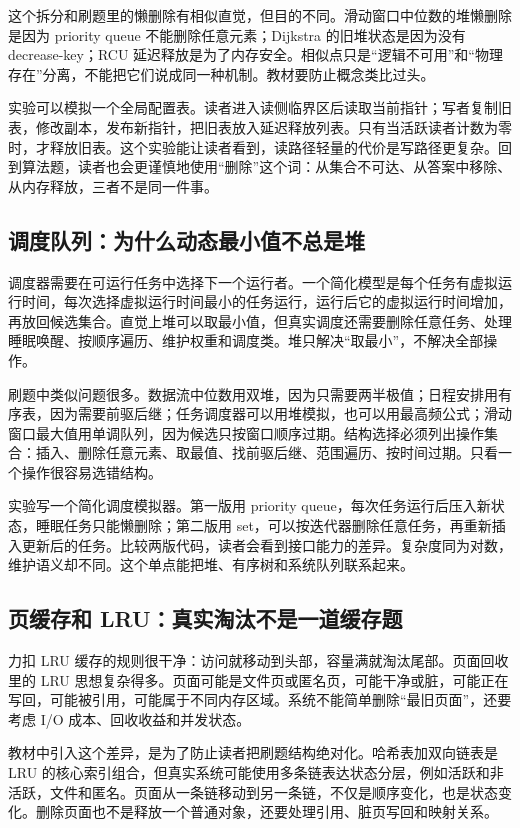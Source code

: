 这个拆分和刷题里的懒删除有相似直觉，但目的不同。滑动窗口中位数的堆懒删除是因为 priority queue 不能删除任意元素；Dijkstra 的旧堆状态是因为没有 decrease-key；RCU 延迟释放是为了内存安全。相似点只是“逻辑不可用”和“物理存在”分离，不能把它们说成同一种机制。教材要防止概念类比过头。

实验可以模拟一个全局配置表。读者进入读侧临界区后读取当前指针；写者复制旧表，修改副本，发布新指针，把旧表放入延迟释放列表。只有当活跃读者计数为零时，才释放旧表。这个实验能让读者看到，读路径轻量的代价是写路径更复杂。回到算法题，读者也会更谨慎地使用“删除”这个词：从集合不可达、从答案中移除、从内存释放，三者不是同一件事。

\subsection{调度队列：为什么动态最小值不总是堆}

调度器需要在可运行任务中选择下一个运行者。一个简化模型是每个任务有虚拟运行时间，每次选择虚拟运行时间最小的任务运行，运行后它的虚拟运行时间增加，再放回候选集合。直觉上堆可以取最小值，但真实调度还需要删除任意任务、处理睡眠唤醒、按顺序遍历、维护权重和调度类。堆只解决“取最小”，不解决全部操作。

刷题中类似问题很多。数据流中位数用双堆，因为只需要两半极值；日程安排用有序表，因为需要前驱后继；任务调度器可以用堆模拟，也可以用最高频公式；滑动窗口最大值用单调队列，因为候选只按窗口顺序过期。结构选择必须列出操作集合：插入、删除任意元素、取最值、找前驱后继、范围遍历、按时间过期。只看一个操作很容易选错结构。

实验写一个简化调度模拟器。第一版用 priority queue，每次任务运行后压入新状态，睡眠任务只能懒删除；第二版用 set，可以按迭代器删除任意任务，再重新插入更新后的任务。比较两版代码，读者会看到接口能力的差异。复杂度同为对数，维护语义却不同。这个单点能把堆、有序树和系统队列联系起来。

\subsection{页缓存和 LRU：真实淘汰不是一道缓存题}

力扣 LRU 缓存的规则很干净：访问就移动到头部，容量满就淘汰尾部。页面回收里的 LRU 思想复杂得多。页面可能是文件页或匿名页，可能干净或脏，可能正在写回，可能被引用，可能属于不同内存区域。系统不能简单删除“最旧页面”，还要考虑 I/O 成本、回收收益和并发状态。

教材中引入这个差异，是为了防止读者把刷题结构绝对化。哈希表加双向链表是 LRU 的核心索引组合，但真实系统可能使用多条链表达状态分层，例如活跃和非活跃，文件和匿名。页面从一条链移动到另一条链，不仅是顺序变化，也是状态变化。删除页面也不是释放一个普通对象，还要处理引用、脏页写回和映射关系。

